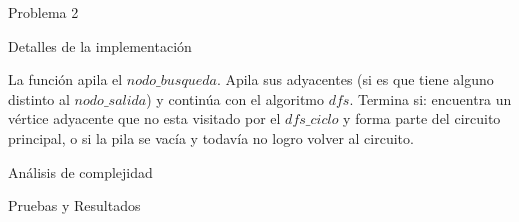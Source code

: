 \begin{section}{Problema 2}
\begin{subsection}{Detalles de la implementación}
\begin{itemize}
			La función apila el $nodo\_busqueda$. Apila sus adyacentes (si es que tiene alguno distinto al $nodo\_salida$) y continúa con el algoritmo $dfs$. Termina si: encuentra un vértice adyacente que no esta visitado por el $dfs\_ciclo$ y forma parte del circuito principal, o si la pila se vacía y todavía no logro volver al circuito.
			


		\end{itemize}
		

	\end{subsection}


	\begin{subsection}{Análisis de complejidad}
		
	\end{subsection}


	\begin{subsection}{Pruebas y Resultados}

	\end{subsection}

\end{section}

